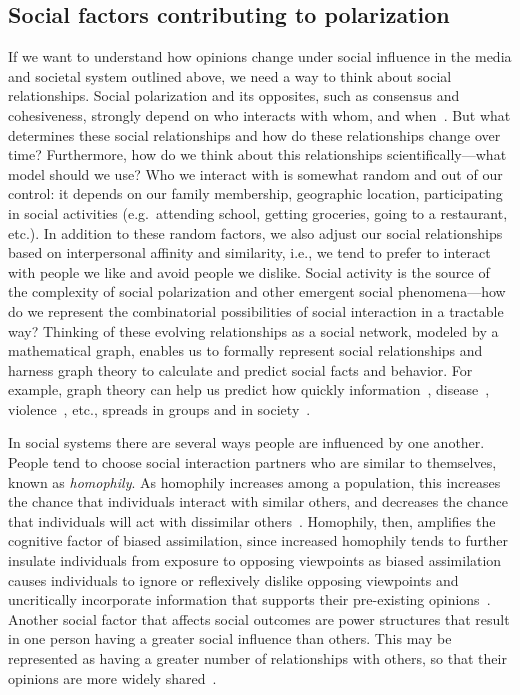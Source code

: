 \documentclass[12pt,letterpaper]{article}
\begin{document}


\subsection{Social factors contributing to polarization}

If we want to understand how opinions change under social influence in the
media and societal system outlined above, we need a way to think about
social relationships. Social polarization and its opposites, such as consensus and cohesiveness, strongly
depend on who interacts with whom, and when~\cite{Flache2008,Turner2018}. 
But what determines these social relationships and how do these relationships
change over time? Furthermore, how do we think about this relationships 
scientifically---what model should we use? Who we interact with is somewhat
random and out of our control: it depends on our family membership, geographic location, 
participating in social activities (e.g.\ attending school, getting
groceries, going to a restaurant, etc.). In addition to these random factors, 
we also adjust our social relationships based on interpersonal affinity and similarity, 
i.e., we tend to prefer to interact with people we like and avoid people we dislike.
Social activity is the source of the complexity of social polarization and
other emergent social phenomena---how do we represent the combinatorial
possibilities of social interaction in a tractable way? Thinking of these
evolving relationships as a social network, modeled by a mathematical graph,
enables us to formally represent social relationships and harness graph
theory to calculate and predict social facts and behavior. For example, graph
theory can help us predict how quickly information~\cite{Milgram1967,Travers1969}, 
disease~\cite{Salathe2010,Block2020}, violence~\cite{Epstein2002}, etc., 
spreads in groups and in society~\cite{Milgram1967,Travers1969,Watts1999,Palla2007,Backstrom2012,Wohlgemuth2014}.

In social systems there are several ways people are influenced by one
another. People tend to choose social interaction partners who 
are similar to themselves, known as \emph{homophily}. As homophily
increases among a population, this
increases the chance that individuals interact with similar others, 
and decreases the chance that individuals will act with dissimilar
others~\cite{McPherson2001}. Homophily, then, amplifies the cognitive factor of biased assimilation,
since increased homophily tends to further insulate individuals from
exposure to opposing viewpoints as biased assimilation causes individuals to 
ignore or reflexively dislike opposing viewpoints and uncritically incorporate
information that supports their pre-existing opinions~\cite{Mark2003,Dandekar2013}.
Another social factor that affects social outcomes are power structures
that result in one person having a greater social influence than others.
This may be represented as having a greater number of relationships
with others, so that their opinions are more widely shared~\cite{French1956,Friedkin1986}.
\end{document}
